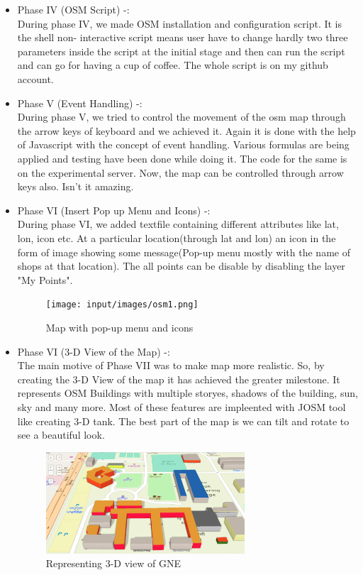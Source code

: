 \begin{itemize}
\item Phase IV (OSM Script) -: \\
        During phase IV, we made OSM installation and configuration script. It is the shell non- interactive script means user have to change hardly two three parameters inside the script at the initial stage and then can run the script and can go for having a cup of coffee. The whole script is on my github account.
\item Phase V (Event Handling) -: \\
During phase V, we tried to control the movement of the osm map through the arrow keys of keyboard and we achieved it. Again it is done with the help of Javascript with the concept of event handling. Various formulas are being applied and testing have been done while doing it. The code for the same is on the experimental server. Now, the map can be controlled through arrow keys also. Isn't it amazing. 
\item Phase VI (Insert Pop up Menu and Icons) -: \\
During phase VI, we added textfile containing different attributes like lat, lon, icon etc. At a particular location(through lat and lon) an icon in the form of image showing some message(Pop-up menu mostly with the name of shops at that location). The all points can be disable by disabling the layer "My Points". 
\begin{figure}[ht]
\centering \texttt{[image: input/images/osm1.png]}
\caption{Map with pop-up menu and icons}
\end{figure}


\item Phase VI (3-D View of the Map) -: \\
The main motive of Phase VII was to make map more realistic. So, by creating the 3-D View of the map it has achieved the greater milestone. It represents OSM Buildings with multiple storyes, shadows of the building, sun, sky and many more. Most of these features are impleented with JOSM tool like creating 3-D tank. The best part of the map is we can tilt and rotate to see a beautiful look.

\begin{figure}[h!]
\centering \includegraphics[width=0.7\textwidth]{input/images/osm_building.png}
\caption{Representing 3-D view of GNE}
\end{figure}



\end{itemize}
